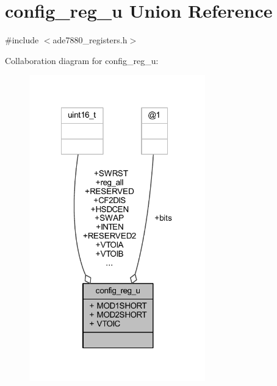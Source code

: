 \hypertarget{a00024}{\section{config\-\_\-reg\-\_\-u Union Reference}
\label{dc/de2/a00024}
}


{\ttfamily \#include $<$ade7880\-\_\-registers.\-h$>$}



Collaboration diagram for config\-\_\-reg\-\_\-u\-:\nopagebreak
\begin{figure}[H]
\begin{center}
\leavevmode
\includegraphics[width=216pt]{da/d2a/a00086}
\end{center}
\end{figure}
